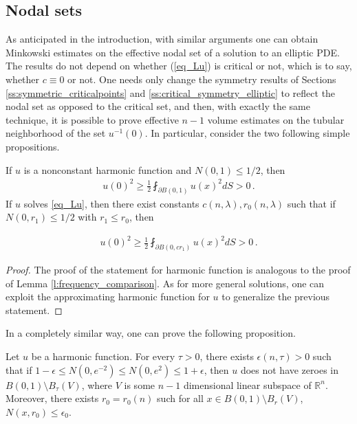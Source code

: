 \documentclass[11pt]{article}
\begin{document}
\begin{appendix}

\section{Nodal sets}\label{sec_nodal}
As anticipated in the introduction, with similar arguments one can obtain Minkowski estimates on the effective nodal set of a solution to an elliptic PDE. The results do not depend on whether (\ref{eq_Lu}) is critical or not, which is to say, whether $c\equiv 0$ or not.  One needs only change the symmetry results of Sections \ref{ss:symmetric_criticalpoints} and \ref{ss:critical_symmetry_elliptic} to reflect the nodal set as opposed to the critical set, and then, with exactly the same technique, it is possible to prove effective $n-1$ volume estimates on the tubular neighborhood of the set $u^{-1}(0)$. In particular, consider the two following simple propositions.
\begin{proposition}\label{prop_epsnod}
 If $u$ is a nonconstant harmonic function and $N(0,1)\leq 1/2$, then
 \begin{gather}
  u(0)^2\geq \frac 1 2 \fint_{\partial B(0,1)} u(x)^2 dS >0\, .
 \end{gather}
If $u$ solves \eqref{eq_Lu}, then there exist constants $c(n,\lambda),r_0(n,\lambda)$ such that if $N(0,r_1)\leq 1/2$ with $r_1\leq r_0$, then
\end{proposition}
\begin{gather}
 u(0)^2 \geq \frac 1 2 \fint_{\partial B(0,cr_1)} u(x)^2 dS >0\, .
\end{gather}
\begin{proof}
 The proof of the statement for harmonic function is analogous to the proof of Lemma \ref{l:frequency_comparison}. As for more general solutions, one can exploit the approximating harmonic function for $u$ to generalize the previous statement.
\end{proof}

In a completely similar way, one can prove the following proposition.
\begin{proposition}\label{prop_nod}
Let $u$ be a harmonic function. For every $\tau>0$, there exists $\epsilon(n,\tau)>0$ such that if $1-\epsilon \leq N(0,e^{-2})\leq N(0,e^2)\leq 1+\epsilon$, then $u$ does not have zeroes in $B(0,1)\setminus B_\tau(V)$, where $V$ is some $n-1$ dimensional linear subspace of ${\mathbb{R}}^n$. Moreover, there exists $r_0=r_0(n)$ such for all $x\in B(0,1)\setminus B_r(V)$, $N(x,r_0)\leq \epsilon_0$.


\end{proposition}
\end{appendix}
\end{document}

